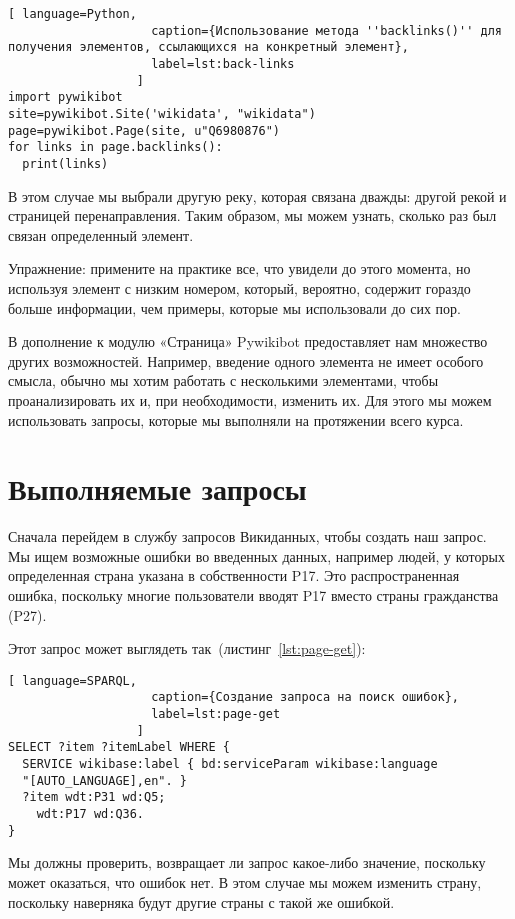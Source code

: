 \begin{lstlisting}[ language=Python,
                    caption={Использование метода ''backlinks()'' для получения элементов, ссылающихся на конкретный элемент},
                    label=lst:back-links
                  ]
import pywikibot
site=pywikibot.Site('wikidata', "wikidata")
page=pywikibot.Page(site, u"Q6980876")
for links in page.backlinks():
  print(links)
\end{lstlisting}

В этом случае мы выбрали другую реку, которая связана дважды: другой рекой и страницей перенаправления. Таким образом, мы можем узнать, сколько раз был связан определенный элемент.

Упражнение: примените на практике все, что увидели до этого момента, но используя элемент с низким номером, который, вероятно, содержит гораздо больше информации, чем примеры, которые мы использовали до сих пор.

В дополнение к модулю «Страница» Pywikibot предоставляет нам множество других возможностей. Например, введение одного элемента не имеет особого смысла, обычно мы хотим работать с несколькими элементами, чтобы проанализировать их и, при необходимости, изменить их. Для этого мы можем использовать запросы, которые мы выполняли на протяжении всего курса.

\section{Выполняемые запросы}
\label{sec:running queries}

Сначала перейдем в службу запросов Викиданных, чтобы создать наш запрос. Мы ищем возможные ошибки во введенных данных, например людей, у которых определенная страна указана в собственности P17. Это распространенная ошибка, поскольку многие пользователи вводят P17 вместо страны гражданства (P27).

Этот запрос может выглядеть так~(листинг~\ref{lst:page-get}):

\begin{lstlisting}[ language=SPARQL,
                    caption={Создание запроса на поиск ошибок},
                    label=lst:page-get
                  ]
SELECT ?item ?itemLabel WHERE {
  SERVICE wikibase:label { bd:serviceParam wikibase:language 
  "[AUTO_LANGUAGE],en". }
  ?item wdt:P31 wd:Q5;
    wdt:P17 wd:Q36.
}
\end{lstlisting}       

Мы должны проверить, возвращает ли запрос какое-либо значение, поскольку может оказаться, что ошибок нет. В этом случае мы можем изменить страну, поскольку наверняка будут другие страны с такой же ошибкой.

